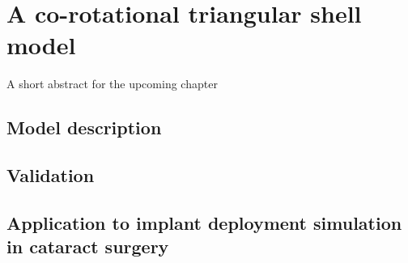 \chapter{A co-rotational triangular shell model }
\label{chap9}
\begin{shortAbstract}
A short abstract for the upcoming chapter
\end{shortAbstract}


\section{Model description}
		
\section{Validation}
		
\section{Application to implant deployment simulation in cataract surgery}